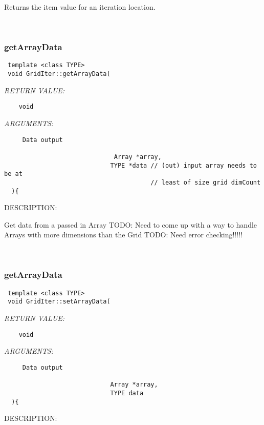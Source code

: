     Returns the item value for an iteration location.
   
 
\mbox{}\hrulefill\
 
\subsubsection [getArrayData] {getArrayData}


  
\begin{verbatim} template <class TYPE>
 void GridIter::getArrayData(\end{verbatim}{\em RETURN VALUE:}
\begin{verbatim}    void\end{verbatim}{\em ARGUMENTS:}
\begin{verbatim}     Data output
   
                              Array *array,
                             TYPE *data // (out) input array needs to be at
                                        // least of size grid dimCount    
  ){\end{verbatim}
{\sf DESCRIPTION:\\ }


   Get data from a passed in Array
   TODO: Need to come up with a way to handle Arrays with more dimensions than the Grid
   TODO: Need error checking!!!!!
   
 
\mbox{}\hrulefill\
 
\subsubsection [getArrayData] {getArrayData}


  
\begin{verbatim} template <class TYPE>
 void GridIter::setArrayData(\end{verbatim}{\em RETURN VALUE:}
\begin{verbatim}    void\end{verbatim}{\em ARGUMENTS:}
\begin{verbatim}     Data output
   
                             Array *array,
                             TYPE data 
  ){\end{verbatim}
{\sf DESCRIPTION:\\ }


